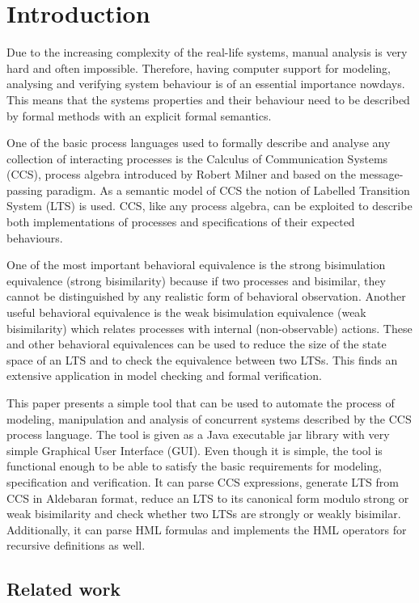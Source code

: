 \section{Introduction}

Due to the increasing complexity of the real-life systems, manual analysis is very hard and often impossible. Therefore, having computer support for modeling, analysing and verifying system behaviour is of an essential importance nowdays. This means that the systems properties and their behaviour need to be described by formal methods with an explicit formal semantics.

One of the basic process languages used to formally describe and analyse any collection of interacting processes is the Calculus of Communication Systems (CCS), process algebra introduced by Robert Milner and based on the message-passing paradigm. As a semantic model of CCS the notion of Labelled Transition System (LTS) is used. CCS, like any process algebra, can be exploited to describe both implementations of processes and specifications of their expected behaviours. 

One of the most important behavioral equivalence is the strong bisimulation equivalence (strong bisimilarity) because if two processes and bisimilar, they cannot be distinguished by any realistic form of behavioral observation. Another useful behavioral equivalence is the weak bisimulation equivalence (weak bisimilarity) which relates processes with internal (non-observable) actions. These and other behavioral equivalences can be used to reduce the size of the state space of an LTS and to check the equivalence between two LTSs. This finds an extensive application in model checking and formal verification.

This paper presents a simple tool that can be used to automate the process of modeling, manipulation and analysis of concurrent systems described by the CCS process language. The tool is given as a Java executable jar library with very simple Graphical User Interface (GUI). Even though it is simple, the tool is functional enough to be able to satisfy the basic requirements for modeling, specification and verification. It can parse CCS expressions, generate LTS from CCS in Aldebaran format, reduce an LTS to its canonical form modulo strong or weak bisimilarity and check whether two LTSs are strongly or weakly bisimilar. Additionally, it can parse HML formulas and implements the HML operators for recursive definitions as well.

\subsection{Related work} 

